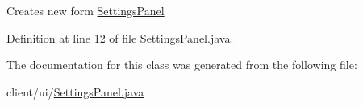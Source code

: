 Creates new form \hyperlink{classclient_1_1ui_1_1_settings_panel}{Settings\+Panel} 

Definition at line 12 of file Settings\+Panel.\+java.



The documentation for this class was generated from the following file\+:\begin{DoxyCompactItemize}
\item 
client/ui/\hyperlink{_settings_panel_8java}{Settings\+Panel.\+java}\end{DoxyCompactItemize}

